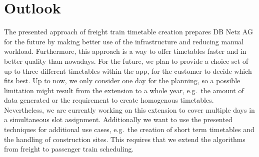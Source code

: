 \section{Outlook}
\label{chap:outlook}
The presented approach of freight train timetable creation prepares DB Netz AG for the future by making better use of the infrastructure and reducing manual workload. Furthermore, this approach is a way to offer timetables faster and in better quality than nowadays.
For the future, we plan to provide a choice set of up to three different timetables within the app, for the customer to decide which fits best. Up to now, we only consider one day for the planning, so a possible limitation might result from the extension to a whole year, e.g.\ the amount of data generated or the requirement to create homogenous timetables. Nevertheless, we are currently working on this extension to cover multiple days in a simultaneous slot assignment.
Additionally we want to use the presented techniques for additional use cases, e.g.\ the creation of short term timetables and the handling of construction sites. This requires that we extend the algorithms from freight to passenger train scheduling.
